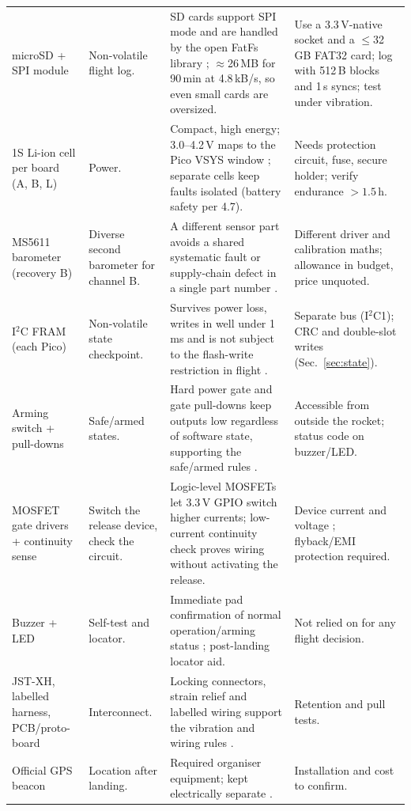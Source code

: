 \begin{longtable}{@{}L{23mm}L{30mm}L{60mm}L{37mm}@{}}
microSD + SPI module & Non-volatile flight log. & SD cards support SPI mode \cite{sdspec} and are handled by the open FatFs library \cite{fatfs}; $\approx$26\,MB for 90\,min at 4.8\,kB/s, so even small cards are oversized. & Use a 3.3\,V-native socket and a $\le$32\,GB FAT32 card; log with 512\,B blocks and 1\,s syncs; test under vibration.\\
1S Li-ion cell per board (A, B, L) & Power. & Compact, high energy; 3.0--4.2\,V maps to the Pico VSYS window \cite{picods}; separate cells keep faults isolated (battery safety per \cite{rtc2027app03} 4.7). & Needs protection circuit, fuse, secure holder; verify endurance $>1.5$\,h.\\
MS5611 barometer (recovery B) & Diverse second barometer for channel B. & A different sensor part avoids a shared systematic fault or supply-chain defect in a single part number \cite{ms5611ds,knight1986}. & Different driver and calibration maths; allowance in budget, price unquoted.\\
I$^2$C FRAM (each Pico) & Non-volatile state checkpoint. & Survives power loss, writes in well under 1\,ms and is not subject to the flash-write restriction in flight \cite{fram,rp2040ds}. & Separate bus (I$^2$C1); CRC and double-slot writes (Sec.~\ref{sec:state}).\\
Arming switch + pull-downs & Safe/armed states. & Hard power gate and gate pull-downs keep outputs low regardless of software state, supporting the safe/armed rules \cite{rtc2027app03}. & Accessible from outside the rocket; status code on buzzer/LED.\\
MOSFET gate drivers + continuity sense & Switch the release device, check the circuit. & Logic-level MOSFETs let 3.3\,V GPIO switch higher currents; low-current continuity check proves wiring without activating the release. & Device current and voltage ; flyback/EMI protection required.\\
Buzzer + LED & Self-test and locator. & Immediate pad confirmation of normal operation/arming status \cite{rtc2027app03}; post-landing locator aid. & Not relied on for any flight decision.\\
JST-XH, labelled harness, PCB/proto-board & Interconnect. & Locking connectors, strain relief and labelled wiring support the vibration and wiring rules \cite{rtc2027app03}. & Retention and pull tests.\\
Official GPS beacon & Location after landing. & Required organiser equipment; kept electrically separate \cite{rtc2027app03}. & Installation and cost to confirm.\\
\end{longtable}
\normalsize

